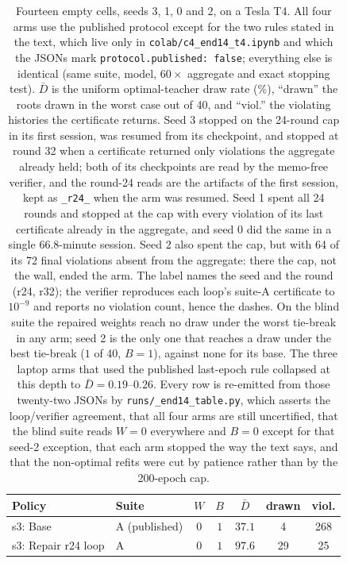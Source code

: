 \documentclass[conference]{IEEEtran}
\begin{document}
\begin{table}[t]
\centering
\caption{Fourteen empty cells, seeds 3, 1, 0 and 2, on a Tesla T4. All four arms use the published protocol except for the two rules stated in the text, which live only in \texttt{colab/c4\_end14\_t4.ipynb} and which the JSONs mark \texttt{protocol.published: false}; everything else is identical (same suite, model, $60\times$ aggregate and exact stopping test). $\bar D$ is the uniform optimal-teacher draw rate (\%), ``drawn'' the roots drawn in the worst case out of 40, and ``viol.'' the violating histories the certificate returns. Seed 3 stopped on the 24-round cap in its first session, was resumed from its checkpoint, and stopped at round 32 when a certificate returned only violations the aggregate already held; both of its checkpoints are read by the memo-free verifier, and the round-24 reads are the artifacts of the first session, kept as \texttt{\_r24\_} when the arm was resumed. Seed 1 spent all 24 rounds and stopped at the cap with every violation of its last certificate already in the aggregate, and seed 0 did the same in a single 66.8-minute session. Seed 2 also spent the cap, but with 64 of its 72 final violations absent from the aggregate: there the cap, not the wall, ended the arm. The label names the seed and the round (r24, r32); the verifier reproduces each loop's suite-A certificate to $10^{-9}$ and reports no violation count, hence the dashes. On the blind suite the repaired weights reach no draw under the worst tie-break in any arm; seed 2 is the only one that reaches a draw under the best tie-break ($1$ of 40, $B=1$), against none for its base. The three laptop arms that used the published last-epoch rule collapsed at this depth to $\bar D=0.19$--$0.26$. Every row is re-emitted from those twenty-two JSONs by \texttt{runs/\allowbreak\_end14\_table.py}, which asserts the loop/verifier agreement, that all four arms are still uncertified, that the blind suite reads $W=0$ everywhere and $B=0$ except for that seed-2 exception, that each arm stopped the way the text says, and that the non-optimal refits were cut by patience rather than by the 200-epoch cap.}
\label{tab:end14}
\setlength{\tabcolsep}{4pt}
\footnotesize
\begin{tabular}{@{}llccccc@{}}
\toprule
\textbf{Policy} & \textbf{Suite} & $W$ & $B$ & $\bar D$ & \textbf{drawn} & \textbf{viol.} \\
\midrule
s3: Base & A (published) & $0$ & $1$ & $37.1$ & 4 & 268 \\
s3: Repair r24 loop & A & $0$ & $1$ & $97.6$ & 29 & 25 \\

\end{tabular}
\end{table}
\end{document}
